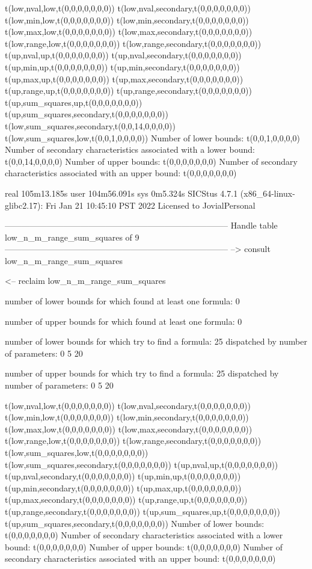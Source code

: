 t(low,nval,low,t(0,0,0,0,0,0,0))
t(low,nval,secondary,t(0,0,0,0,0,0,0))
t(low,min,low,t(0,0,0,0,0,0,0))
t(low,min,secondary,t(0,0,0,0,0,0,0))
t(low,max,low,t(0,0,0,0,0,0,0))
t(low,max,secondary,t(0,0,0,0,0,0,0))
t(low,range,low,t(0,0,0,0,0,0,0))
t(low,range,secondary,t(0,0,0,0,0,0,0))
t(up,nval,up,t(0,0,0,0,0,0,0))
t(up,nval,secondary,t(0,0,0,0,0,0,0))
t(up,min,up,t(0,0,0,0,0,0,0))
t(up,min,secondary,t(0,0,0,0,0,0,0))
t(up,max,up,t(0,0,0,0,0,0,0))
t(up,max,secondary,t(0,0,0,0,0,0,0))
t(up,range,up,t(0,0,0,0,0,0,0))
t(up,range,secondary,t(0,0,0,0,0,0,0))
t(up,sum_squares,up,t(0,0,0,0,0,0,0))
t(up,sum_squares,secondary,t(0,0,0,0,0,0,0))
t(low,sum_squares,secondary,t(0,0,14,0,0,0,0))
t(low,sum_squares,low,t(0,0,1,0,0,0,0))
Number of lower bounds:                                             t(0,0,1,0,0,0,0)
Number of secondary characteristics associated with a lower bound:  t(0,0,14,0,0,0,0)
Number of upper bounds:                                             t(0,0,0,0,0,0,0)
Number of secondary characteristics associated with an upper bound: t(0,0,0,0,0,0,0)

real	105m13.185s
user	104m56.091s
sys	0m5.324s
SICStus 4.7.1 (x86_64-linux-glibc2.17): Fri Jan 21 10:45:10 PST 2022
Licensed to JovialPersonal


--------------------------------------------------------------------------------
Handle table low_n_m_range_sum_squares of 9
--------------------------------------------------------------------------------
--> consult low_n_m_range_sum_squares

<-- reclaim low_n_m_range_sum_squares

number of lower bounds for which found at least one formula: 0

number of upper bounds for which found at least one formula: 0

number of lower bounds for which try to find a formula: 25
dispatched by number of parameters: 0  5  20

number of upper bounds for which try to find a formula: 25
dispatched by number of parameters: 0  5  20

t(low,nval,low,t(0,0,0,0,0,0,0))
t(low,nval,secondary,t(0,0,0,0,0,0,0))
t(low,min,low,t(0,0,0,0,0,0,0))
t(low,min,secondary,t(0,0,0,0,0,0,0))
t(low,max,low,t(0,0,0,0,0,0,0))
t(low,max,secondary,t(0,0,0,0,0,0,0))
t(low,range,low,t(0,0,0,0,0,0,0))
t(low,range,secondary,t(0,0,0,0,0,0,0))
t(low,sum_squares,low,t(0,0,0,0,0,0,0))
t(low,sum_squares,secondary,t(0,0,0,0,0,0,0))
t(up,nval,up,t(0,0,0,0,0,0,0))
t(up,nval,secondary,t(0,0,0,0,0,0,0))
t(up,min,up,t(0,0,0,0,0,0,0))
t(up,min,secondary,t(0,0,0,0,0,0,0))
t(up,max,up,t(0,0,0,0,0,0,0))
t(up,max,secondary,t(0,0,0,0,0,0,0))
t(up,range,up,t(0,0,0,0,0,0,0))
t(up,range,secondary,t(0,0,0,0,0,0,0))
t(up,sum_squares,up,t(0,0,0,0,0,0,0))
t(up,sum_squares,secondary,t(0,0,0,0,0,0,0))
Number of lower bounds:                                             t(0,0,0,0,0,0,0)
Number of secondary characteristics associated with a lower bound:  t(0,0,0,0,0,0,0)
Number of upper bounds:                                             t(0,0,0,0,0,0,0)
Number of secondary characteristics associated with an upper bound: t(0,0,0,0,0,0,0)

